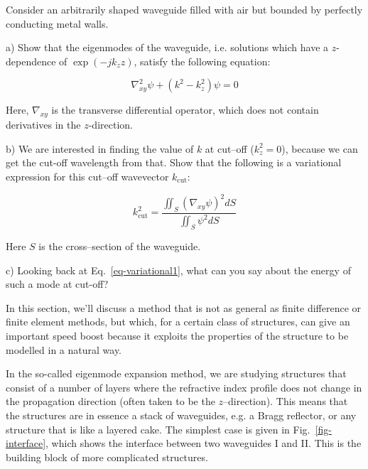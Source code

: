 \begin{exer}
  
  Consider an arbitrarily shaped waveguide filled with air but bounded by perfectly conducting metal walls.

  a) Show that the eigenmodes of the waveguide, i.e. solutions which have a $z$-dependence of $\exp{(-j k_z z)}$, satisfy the following equation:

$$ \nabla_{xy}^2 \psi + \left( k^2 - k_z^2 \right)\psi = 0 $$ 

Here, $\nabla_{xy}$ is the transverse differential operator, which does not contain derivatives in the $z$-direction.

\noindent{} b) We are interested in finding the value of $k$ at cut--off ($k_z^2=0$), because we can get the cut-off wavelength from that. Show that the following is a variational expression for this cut--off wavevector $k_{\mathrm{cut}}$:

$$ k_{\mathrm{cut}}^2 = \frac{\iint_S (\nabla_{xy} \psi)^2 dS}{\iint_S \psi^2 dS}$$

Here $S$ is the cross--section of the waveguide.

c) Looking back at Eq.~\ref{eq-variational1}, what can you say about the energy of such a mode at cut-off?

\end{exer}


\pagebreak


\label{week7}


In this section, we'll discuss a method that is not as general as finite difference or finite element methods, but which, for a certain class of structures, can give an important speed boost because it exploits the properties of the structure to be modelled in a natural way.

In the so-called eigenmode expansion method, we are studying structures that consist of a number of layers where the refractive index profile does not change in the propagation direction (often taken to be the $z$--direction). This means that the structures are in essence a stack of waveguides, e.g. a Bragg reflector, or any structure that is like a layered cake. 
The simplest case is given in Fig.~\ref{fig-interface}, which shows the interface between two waveguides I and II. This is the building block of more complicated structures.

